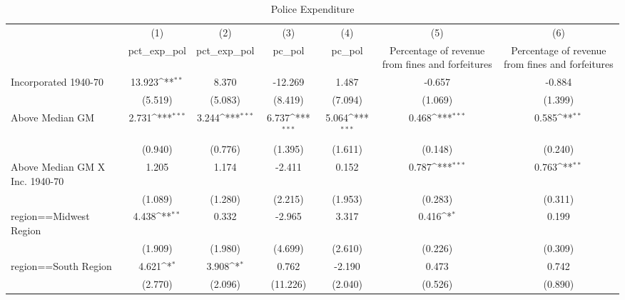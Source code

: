 \begin{table}[htbp]\centering
\def\sym#1{\ifmmode^{#1}\else\(^{#1}\)\fi}
\caption{Police Expenditure}
\begin{tabular}{l*{6}{c}}
\hline\hline
                    &\multicolumn{1}{c}{(1)}&\multicolumn{1}{c}{(2)}&\multicolumn{1}{c}{(3)}&\multicolumn{1}{c}{(4)}&\multicolumn{1}{c}{(5)}&\multicolumn{1}{c}{(6)}\\
                    &\multicolumn{1}{c}{pct\_exp\_pol}&\multicolumn{1}{c}{pct\_exp\_pol}&\multicolumn{1}{c}{pc\_pol}&\multicolumn{1}{c}{pc\_pol}&\multicolumn{1}{c}{Percentage of revenue from fines and forfeitures}&\multicolumn{1}{c}{Percentage of revenue from fines and forfeitures}\\
\hline
Incorporated 1940-70&      13.923\sym{**} &       8.370         &     -12.269         &       1.487         &      -0.657         &      -0.884         \\
                    &     (5.519)         &     (5.083)         &     (8.419)         &     (7.094)         &     (1.069)         &     (1.399)         \\
[1em]
Above Median GM     &       2.731\sym{***}&       3.244\sym{***}&       6.737\sym{***}&       5.064\sym{***}&       0.468\sym{***}&       0.585\sym{**} \\
                    &     (0.940)         &     (0.776)         &     (1.395)         &     (1.611)         &     (0.148)         &     (0.240)         \\
[1em]
Above Median GM X Inc. 1940-70&       1.205         &       1.174         &      -2.411         &       0.152         &       0.787\sym{***}&       0.763\sym{**} \\
                    &     (1.089)         &     (1.280)         &     (2.215)         &     (1.953)         &     (0.283)         &     (0.311)         \\
[1em]
region==Midwest Region&       4.438\sym{**} &       0.332         &      -2.965         &       3.317         &       0.416\sym{*}  &       0.199         \\
                    &     (1.909)         &     (1.980)         &     (4.699)         &     (2.610)         &     (0.226)         &     (0.309)         \\
[1em]
region==South Region&       4.621\sym{*}  &       3.908\sym{*}  &       0.762         &      -2.190         &       0.473         &       0.742         \\
                    &     (2.770)         &     (2.096)         &    (11.226)         &     (2.040)         &     (0.526)         &     (0.890)         \\

\end{tabular}
\end{table}
